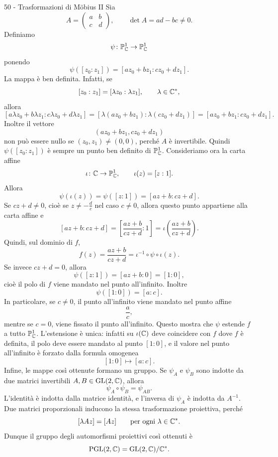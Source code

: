 \documentclass[a4paper]{article}
\begin{document}
\begin{snippetsolution}{50 - Trasformazioni di Möbius II}
    Sia
    \[
        A=
        \begin{pmatrix}
            a & b\\
            c & d
        \end{pmatrix},
        \qquad
        \det A=ad-bc\neq0.
    \]
    Definiamo
    \[
        \psi\colon\mathbb{P}^1_{\mathbb{C}}\to\mathbb{P}^1_{\mathbb{C}}
    \]
    ponendo
    \[
        \psi([z_0:z_1])
        =
        [az_0+bz_1:cz_0+dz_1].
    \]
    La mappa è ben definita. Infatti, se
    \[
        [z_0:z_1]=[\lambda z_0:\lambda z_1],
        \qquad
        \lambda\in\mathbb{C}^*,
    \]
    allora
    \[
        [a\lambda z_0+b\lambda z_1:c\lambda z_0+d\lambda z_1]
        =
        [\lambda(az_0+bz_1):\lambda(cz_0+dz_1)]
        =
        [az_0+bz_1:cz_0+dz_1].
    \]
    Inoltre il vettore
    \[
        (az_0+bz_1,cz_0+dz_1)
    \]
    non può essere nullo se \((z_0,z_1)\neq(0,0)\), perché \(A\) è invertibile. Quindi \(\psi([z_0:z_1])\) è sempre un punto ben definito di \(\mathbb{P}^1_{\mathbb{C}}\).
    Consideriamo ora la carta affine
    \[
        \iota\colon\mathbb{C}\to\mathbb{P}^1_{\mathbb{C}},
        \qquad
        \iota(z)=[z:1].
    \]
    Allora
    \[
        \psi(\iota(z))
        =
        \psi([z:1])
        =
        [az+b:cz+d].
    \]
    Se \(cz+d\neq0\), cioè se \(z\neq-\frac dc\) nel caso \(c\neq0\), allora questo punto appartiene alla carta affine e
    \[
        [az+b:cz+d]
        =
        \left[
            \frac{az+b}{cz+d}:1
        \right]
        =
        \iota\left(\frac{az+b}{cz+d}\right).
    \]
    Quindi, sul dominio di \(f\),
    \[
        f(z)=\frac{az+b}{cz+d}
        =
        \iota^{-1}\circ\psi\circ\iota(z).
    \]
    Se invece \(cz+d=0\), allora
    \[
        \psi([z:1])=[az+b:0]=[1:0],
    \]
    cioè il polo di \(f\) viene mandato nel punto all'infinito. Inoltre
    \[
        \psi([1:0])=[a:c].
    \]
    In particolare, se \(c\neq0\), il punto all'infinito viene mandato nel punto affine
    \[
        \frac ac,
    \]
    mentre se \(c=0\), viene fissato il punto all'infinito.
    Questo mostra che \(\psi\) estende \(f\) a tutto \(\mathbb{P}^1_{\mathbb{C}}\). L'estensione è unica: infatti su \(\iota(\mathbb{C})\) deve coincidere con \(f\) dove \(f\) è definita, il polo deve essere mandato al punto \([1:0]\), e il valore nel punto all'infinito è forzato dalla formula omogenea
    \[
        [1:0]\longmapsto[a:c].
    \]
    Infine, le mappe così ottenute formano un gruppo. Se \(\psi_A\) e \(\psi_B\) sono indotte da due matrici invertibili \(A,B\in\operatorname{GL}(2,\mathbb{C})\), allora
    \[
        \psi_A\circ\psi_B=\psi_{AB}.
    \]
    L'identità è indotta dalla matrice identità, e l'inversa di \(\psi_A\) è indotta da \(A^{-1}\). Due matrici proporzionali inducono la stessa trasformazione proiettiva, perché
    \[
        [\lambda Az]=[Az]
        \qquad
        \text{per ogni }\lambda\in\mathbb{C}^*.
    \]
    Dunque il gruppo degli automorfismi proiettivi così ottenuti è
    \[
        \operatorname{PGL}(2,\mathbb{C})
        =
        \operatorname{GL}(2,\mathbb{C})/\mathbb{C}^*.
    \]
\end{snippetsolution}
\end{document}
